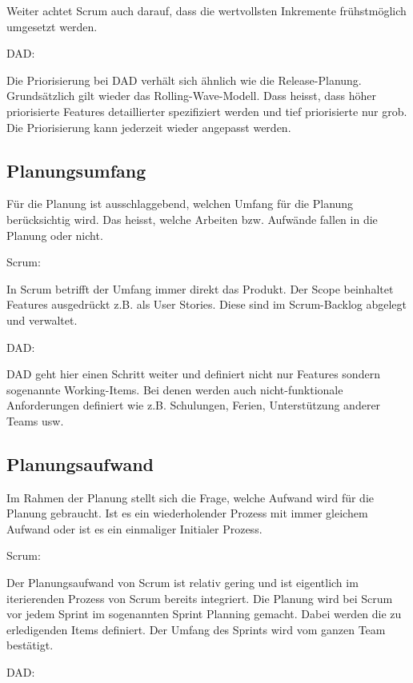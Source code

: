 Weiter achtet Scrum auch darauf, dass die wertvollsten Inkremente frühstmöglich umgesetzt werden.\bigskip 

{\Large DAD:} \cite{planningPrioDad} \medskip

Die Priorisierung bei DAD verhält sich ähnlich wie die Release-Planung. Grundsätzlich gilt wieder das Rolling-Wave-Modell. Dass heisst, dass höher priorisierte Features detaillierter spezifiziert werden und tief priorisierte nur grob. Die Priorisierung kann jederzeit wieder angepasst werden.


\subsection{Planungsumfang}

Für die Planung ist ausschlaggebend, welchen Umfang für die Planung berücksichtig wird. Das heisst, welche Arbeiten bzw. Aufwände fallen in die Planung oder nicht.

{\Large Scrum:} \medskip

In Scrum betrifft der Umfang immer direkt das Produkt. Der Scope beinhaltet Features ausgedrückt z.B. als User Stories. Diese sind im Scrum-Backlog abgelegt und verwaltet.
\bigskip 

{\Large DAD:} \cite{planningScopeDad} \medskip

DAD geht hier einen Schritt weiter und definiert nicht nur Features sondern sogenannte Working-Items. Bei denen werden auch nicht-funktionale Anforderungen definiert wie z.B. Schulungen, Ferien, Unterstützung anderer Teams usw.	


\subsection{Planungsaufwand}

Im Rahmen der Planung stellt sich die Frage, welche Aufwand wird für die Planung gebraucht. Ist es ein wiederholender Prozess mit immer gleichem Aufwand oder ist es ein einmaliger Initialer Prozess.

{\Large Scrum:} \medskip

Der Planungsaufwand von Scrum ist relativ gering und ist eigentlich im iterierenden Prozess von Scrum bereits integriert. Die Planung wird bei Scrum vor jedem Sprint im sogenannten Sprint Planning gemacht. Dabei werden die zu erledigenden Items definiert. Der Umfang des Sprints wird vom ganzen Team bestätigt.\bigskip 

{\Large DAD:} \medskip

